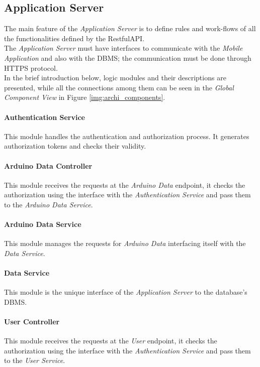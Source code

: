 \subsection{Application Server}
The main feature of the \textit{Application Server} is to define rules and work-flows of all the functionalities defined by the RestfulAPI.\\
The \textit{Application Server} must have interfaces to communicate with the \textit{Mobile Application} and also with the DBMS; the communication must be done through HTTPS protocol.\\
In the brief introduction below, logic modules and their descriptions are presented, while all the connections among them can be seen in the \textit{Global Component View} in Figure \ref{img:archi_components}.

\paragraph{Authentication Service}
This module handles the authentication and authorization process. It generates authorization tokens and checks their validity.

\paragraph{Arduino Data Controller}
This module receives the requests at the \textit{Arduino Data} endpoint, it checks the authorization using the interface with the \textit{Authentication Service} and pass them to the \textit{Arduino Data Service}.

\paragraph{Arduino Data Service}
This module manages the requests for \textit{Arduino Data} interfacing itself with the \textit{Data Service}.

\paragraph{Data Service}
This module is the unique interface of the \textit{Application Server} to the database's DBMS.

\paragraph{User Controller}
This module receives the requests at the \textit{User} endpoint, it checks the authorization using the interface with the \textit{Authentication Service} and pass them to the \textit{User Service}.

